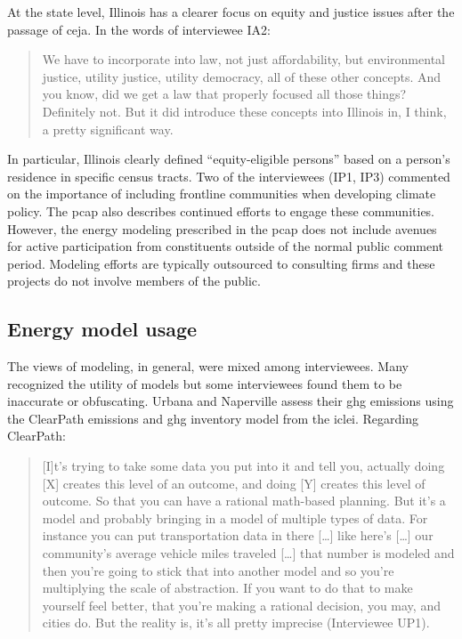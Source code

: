 At the state level, Illinois has a clearer focus on equity and justice issues
after the passage of \ac{ceja}. In the words of interviewee IA2:
\begin{quote}
    We have to incorporate into law, not just affordability, but environmental
    justice, utility justice, utility democracy, all of these other concepts.
    And you know, did we get a law that properly focused all those things?
    Definitely not. But it did introduce these concepts into Illinois in, I
    think, a pretty significant way.
\end{quote}
In particular, Illinois clearly defined ``equity-eligible persons'' based on a
person's residence in specific census tracts. Two of the interviewees (IP1, IP3)
commented on the importance of including frontline communities when developing
climate policy. The \ac{pcap} also describes continued efforts to engage these
communities. However, the energy modeling prescribed in the \ac{pcap} does not
include avenues for active participation from constituents outside of the normal
public comment period. Modeling efforts are typically outsourced to consulting
firms and these projects do not involve members of the public.



\subsection{Energy model usage}
\label{section:muni-model-usage}

The views of modeling, in general, were mixed among interviewees. Many
recognized the utility of models but some interviewees found them to be
inaccurate or obfuscating. Urbana and Naperville assess their \ac{ghg} emissions
using the ClearPath emissions and \ac{ghg} inventory model from the \acf{iclei}.
Regarding ClearPath:
\begin{quote}
    [I]t's trying to take some data you put into it and tell you, actually doing
    [X] creates this level of an outcome, and doing [Y] creates this level of
    outcome. So that you can have a rational math-based planning. But it's a
    model and probably bringing in a model of multiple types of data. For
    instance you can put transportation data in there [\dots] like here's
    [\dots] our community's average vehicle miles traveled [\dots] that number
    is modeled and then you're going to stick that into another model and so
    you're multiplying the scale of abstraction. If you want to do that to make
    yourself feel better, that you're making a rational decision, you may, and
    cities do. But the reality is, it's all pretty imprecise (Interviewee UP1). 
\end{quote}

